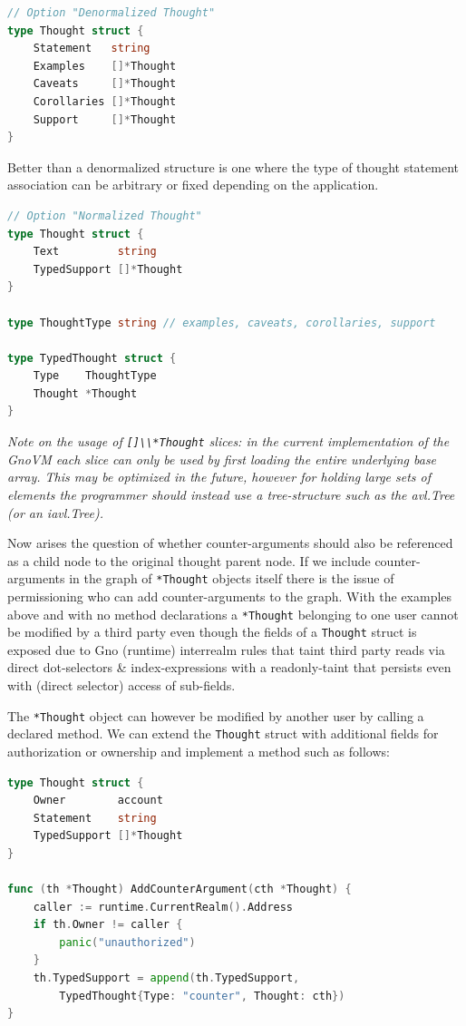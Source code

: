 \documentclass[12pt,a4paper]{article}
\newcommand{\passthrough}[1]{#1}
\begin{document}
\begin{lstlisting}[language=Go]
// Option "Denormalized Thought"
type Thought struct {
    Statement   string
    Examples    []*Thought
    Caveats     []*Thought
    Corollaries []*Thought
    Support     []*Thought
}
\end{lstlisting}

Better than a denormalized structure is one where the type of thought
statement association can be arbitrary or fixed depending on the
application.

\begin{lstlisting}[language=Go]
// Option "Normalized Thought"
type Thought struct {
    Text         string
    TypedSupport []*Thought
}

type ThoughtType string // examples, caveats, corollaries, support

type TypedThought struct {
    Type    ThoughtType
    Thought *Thought
}
\end{lstlisting}

\emph{Note on the usage of \passthrough{\lstinline![]\\*Thought!}
slices: in the current implementation of the GnoVM each slice can only
be used by first loading the entire underlying base array. This may be
optimized in the future, however for holding large sets of elements the
programmer should instead use a tree-structure such as the avl.Tree (or
an iavl.Tree).}

Now arises the question of whether counter-arguments should also be
referenced as a child node to the original thought parent node. If we
include counter-arguments in the graph of
\passthrough{\lstinline!*Thought!} objects itself there is the issue of
permissioning who can add counter-arguments to the graph. With the
examples above and with no method declarations a
\passthrough{\lstinline!*Thought!} belonging to one user cannot be
modified by a third party even though the fields of a
\passthrough{\lstinline!Thought!} struct is exposed due to Gno (runtime)
interrealm rules that taint third party reads via direct dot-selectors
\& index-expressions with a readonly-taint that persists even with
(direct selector) access of sub-fields.

The \passthrough{\lstinline!*Thought!} object can however be modified by
another user by calling a declared method. We can extend the
\passthrough{\lstinline!Thought!} struct with additional fields for
authorization or ownership and implement a method such as follows:

\begin{lstlisting}[language=Go]
type Thought struct {
    Owner        account
    Statement    string
    TypedSupport []*Thought
}

func (th *Thought) AddCounterArgument(cth *Thought) {
    caller := runtime.CurrentRealm().Address
    if th.Owner != caller {
        panic("unauthorized")
    }
    th.TypedSupport = append(th.TypedSupport,
        TypedThought{Type: "counter", Thought: cth})
}
\end{lstlisting}
\end{document}
